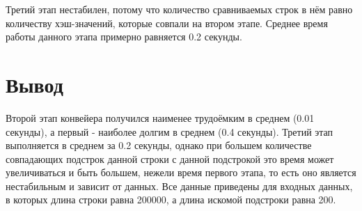 Третий этап нестабилен, потому что количество сравниваемых строк в нём равно количеству хэш-значений, которые совпали на втором этапе. Среднее время работы данного этапа примерно равняется 0.2 секунды.

\section*{Вывод}

Второй этап конвейера получился наименее трудоёмким в среднем (0.01 секунды), а первый - наиболее долгим в среднем (0.4 секунды). Третий этап выполняется в среднем за 0.2 секунды, однако при большем количестве совпадающих подстрок данной строки с данной подстрокой это время может увеличиваться и быть большем, нежели время первого этапа, то есть оно является нестабильным и зависит от данных. Все данные приведены для входных данных, в которых длина строки равна 200000, а длина искомой подстроки равна 200.
